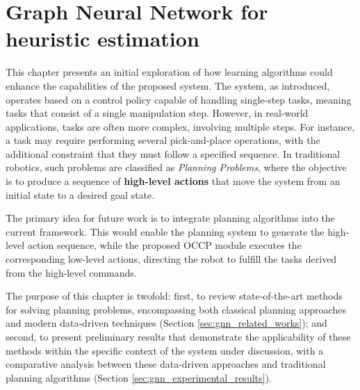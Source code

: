 \chapter{Graph Neural Network for heuristic estimation}
This chapter presents an initial exploration of how learning algorithms could enhance the capabilities of the proposed system. The system, as introduced, operates based on a control policy capable of handling single-step tasks, meaning tasks that consist of a single manipulation step. However, in real-world applications, tasks are often more complex, involving multiple steps. For instance, a task may require performing several pick-and-place operations, with the additional constraint that they must follow a specified sequence. In traditional robotics, such problems are classified as \textit{Planning Problems}, where the objective is to produce a sequence of \textbf{high-level actions} that move the system from an initial state to a desired goal state. 

The primary idea for future work is to integrate planning algorithms into the current framework. This would enable the planning system to generate the high-level action sequence, while the proposed OCCP module executes the corresponding low-level actions, directing the robot to fulfill the tasks derived from the high-level commands.

The purpose of this chapter is twofold: first, to review state-of-the-art methods for solving planning problems, encompassing both classical planning approaches and modern data-driven techniques (Section \ref{sec:gnn_related_works}); and second, to present preliminary results that demonstrate the applicability of these methods within the specific context of the system under discussion, with a comparative analysis between these data-driven approaches and traditional planning algorithms (Section \ref{sec:gnn_experimental_results}).




